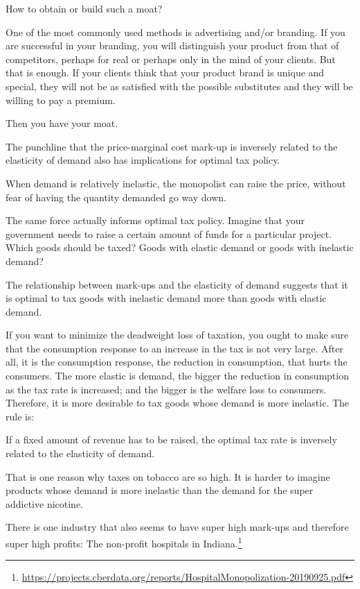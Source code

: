 \documentclass[
]{book}
\begin{document}
How to obtain or build such a moat?

One of the most commonly used methods is advertising and/or branding. If you are successful in your branding, you will distinguish your product from that of competitors, perhaps for real or perhaps only in the mind of your clients. But that is enough. If your clients think that your product brand is unique and special, they will not be as satisfied with the possible substitutes and they will be willing to pay a premium.

Then you have your moat.

The punchline that the price-marginal cost mark-up is inversely related to the elasticity of demand also has implications for optimal tax policy.

When demand is relatively inelastic, the monopolist can raise the price, without fear of having the quantity demanded go way down.

The same force actually informs optimal tax policy. Imagine that your government needs to raise a certain amount of funds for a particular project. Which goods should be taxed? Goods with elastic demand or goods with inelastic demand?

The relationship between mark-ups and the elasticity of demand suggests that it is optimal to tax goods with inelastic demand more than goods with elastic demand.

If you want to minimize the deadweight loss of taxation, you ought to make sure that the consumption response to an increase in the tax is not very large. After all, it is the consumption response, the reduction in consumption, that hurts the consumers. The more elastic is demand, the bigger the reduction in consumption as the tax rate is increased; and the bigger is the welfare loss to consumers. Therefore, it is more desirable to tax goods whose demand is more inelastic. The rule is:

If a fixed amount of revenue has to be raised, the optimal tax rate is inversely related to the elasticity of demand.

That is one reason why taxes on tobacco are so high. It is harder to imagine products whose demand is more inelastic than the demand for the super addictive nicotine.

There is one industry that also seems to have super high mark-ups and therefore super high profits: The non-profit hospitals in Indiana.\footnote{\url{https://projects.cberdata.org/reports/HospitalMonopolization-20190925.pdf}}
\end{document}

